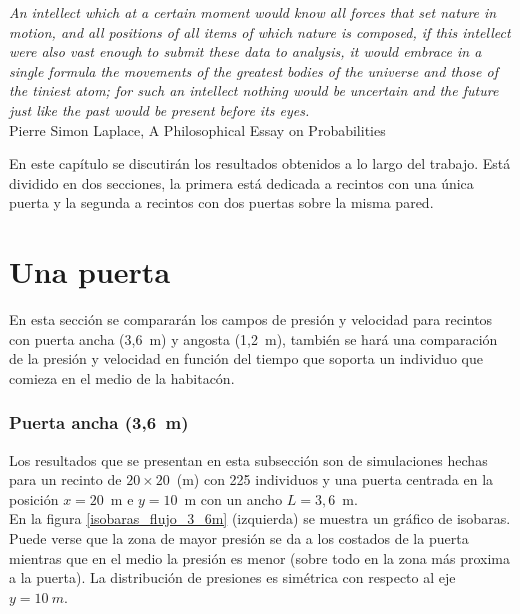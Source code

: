 \begin{flushleft}
 {\footnotesize{ \textsl {An intellect which at a certain moment would know all forces that set nature in motion, and all positions of all items of which nature is composed, if this intellect were also vast enough to submit these data to analysis, it would embrace in a single formula the movements of the greatest bodies of the universe and those of the tiniest atom; for such an intellect nothing would be uncertain and the future just like the past would be present before its eyes.}}} \\
\footnotesize  Pierre Simon Laplace, A Philosophical Essay on Probabilities\\
\end{flushleft}

En este capítulo se discutirán los resultados obtenidos a lo largo del trabajo. Está dividido en dos secciones, la primera está dedicada a recintos con una única puerta y la segunda a recintos con dos puertas sobre la misma pared.  

\section{Una puerta}

En esta sección se compararán los campos de presión y velocidad para recintos con puerta ancha (3,6~m) y angosta (1,2~m), también se hará una comparación de la presión y velocidad en función del tiempo que soporta un individuo que comieza en el medio de la habitacón.    

\subsubsection{Puerta ancha (3,6~m)}

Los resultados que se presentan en esta subsección son de simulaciones hechas para un recinto de  $20\times 20$~(m) con 225 individuos y una puerta centrada en la posición $x=20$~m e $y=10$~m con un ancho $L=3,6$~m.\\
En la figura \ref{isobaras_flujo_3_6m} (izquierda) se muestra un gráfico de isobaras. Puede verse que la zona de mayor presión se da a los costados de la puerta mientras que en el medio la presión es menor (sobre todo en la zona más proxima a la puerta). La distribución de presiones es simétrica con respecto al eje $y=10~m$. 

